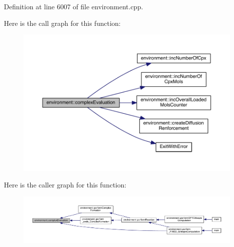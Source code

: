 Definition at line 6007 of file environment.\+cpp.



Here is the call graph for this function\+:\nopagebreak
\begin{figure}[H]
\begin{center}
\leavevmode
\includegraphics[width=350pt]{a00013_a5ee6b203f077de1467aa72042814db7d_cgraph}
\end{center}
\end{figure}




Here is the caller graph for this function\+:\nopagebreak
\begin{figure}[H]
\begin{center}
\leavevmode
\includegraphics[width=350pt]{a00013_a5ee6b203f077de1467aa72042814db7d_icgraph}
\end{center}
\end{figure}


